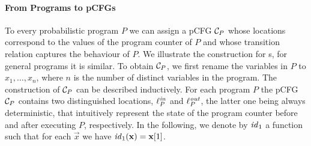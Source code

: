 \paragraph*{From Programs to pCFGs}
To every probabilistic program $P$ we can assign a pCFG $\mathcal{C}_P$ whose 
locations correspond to the values of the
program counter of $P$ and whose transition relation captures the behaviour of
$P$. We illustrate the construction for \APP{}s, for general programs it is 
similar. To obtain $\mathcal{C}_{P}$, we first rename 
the variables in $P$ to 
$x_1,\dots,x_n$, where $n$ is the number of distinct variables in the program. 
The
construction of $\mathcal{C}_P$ can be described inductively.
For each program $P$ the pCFG $\mathcal{C}_P$ contains two distinguished
locations, $\ell^{\mathit{in}}_{P}$ and $\ell^{\mathit{out}}_{P}$, the latter one being always
deterministic, that intuitively represent the state of the program counter
before and after executing $P$, respectively. In the following, we denote by 
$\mathit{id}_1$ a function such that for each $\vec{x}$ we have 
$\mathit{id}_{1}(\mathbf{x})=\mathbf{x}[1]$.
